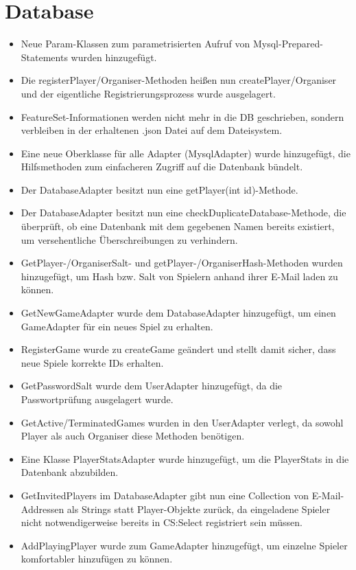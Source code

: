 \documentclass[a4paper]{scrreprt}
\begin{document}
\section{Database}
\begin{itemize}
    \item Neue Param-Klassen zum parametrisierten Aufruf von Mysql-Prepared-Statements wurden hinzugefügt.
    \item Die registerPlayer/Organiser-Methoden heißen nun createPlayer/Organiser und der eigentliche Registrierungsprozess wurde ausgelagert.
    \item FeatureSet-Informationen werden nicht mehr in die DB geschrieben, sondern verbleiben in der erhaltenen .json Datei auf dem Dateisystem.
    \item  Eine neue Oberklasse für alle Adapter (MysqlAdapter) wurde hinzugefügt, die Hilfsmethoden zum einfacheren Zugriff auf die Datenbank bündelt.
    \item Der DatabaseAdapter besitzt nun eine getPlayer(int id)-Methode.
    \item Der DatabaseAdapter besitzt nun eine checkDuplicateDatabase-Methode, die überprüft, ob eine Datenbank mit dem gegebenen Namen bereits existiert, um versehentliche Überschreibungen zu verhindern.
    \item GetPlayer-/OrganiserSalt- und getPlayer-/OrganiserHash-Methoden wurden hinzugefügt, um Hash bzw. Salt von Spielern anhand ihrer E-Mail laden zu können.
    \item GetNewGameAdapter wurde dem DatabaseAdapter hinzugefügt, um einen GameAdapter für ein neues Spiel zu erhalten.
    \item RegisterGame wurde zu createGame geändert und stellt damit sicher, dass neue Spiele korrekte IDs erhalten.
    \item GetPasswordSalt wurde dem UserAdapter hinzugefügt, da die Passwortprüfung ausgelagert wurde.
    \item GetActive/TerminatedGames wurden in den UserAdapter verlegt, da sowohl Player als auch Organiser diese Methoden benötigen.
    \item Eine Klasse PlayerStatsAdapter wurde hinzugefügt, um die PlayerStats in die Datenbank abzubilden.
    \item GetInvitedPlayers im DatabaseAdapter gibt nun eine Collection von E-Mail-Addressen als Strings statt Player-Objekte zurück, da eingeladene Spieler nicht notwendigerweise bereits in CS:Select registriert sein müssen.
    \item AddPlayingPlayer wurde zum GameAdapter hinzugefügt, um einzelne Spieler komfortabler hinzufügen zu können.
\end{itemize}
\end{document}
